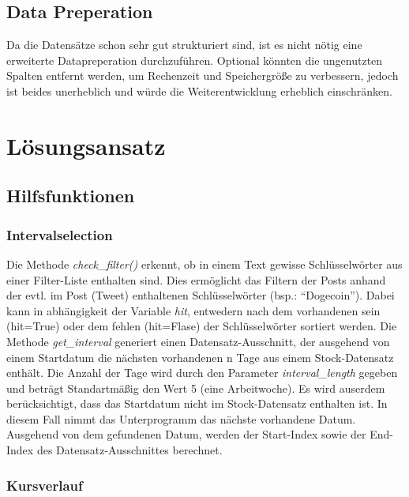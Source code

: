 \documentclass{article}
\begin{document}
\subsection{Data Preperation}
Da die Datensätze schon sehr gut strukturiert sind, ist es nicht nötig eine erweiterte Datapreperation durchzuführen.
Optional könnten die ungenutzten Spalten entfernt werden, um Rechenzeit und Speichergröße zu verbessern, jedoch ist beides unerheblich und würde die Weiterentwicklung erheblich einschränken.



\section{Lösungsansatz}


\subsection{Hilfsfunktionen}

\subsubsection{Intervalselection}
Die Methode \textit{check\_filter()} erkennt, ob in einem Text gewisse Schlüsselwörter aus einer Filter-Liste enthalten sind.
Dies ermöglicht das Filtern der Posts anhand der evtl. im Post (Tweet) enthaltenen Schlüsselwörter (bsp.: ``Dogecoin'').
Dabei kann in abhängigkeit der Variable \textit{hit}, entwedern nach dem vorhandenen sein (hit=True) oder dem fehlen (hit=Flase) der Schlüsselwörter sortiert werden.
Die Methode \textit{get\_interval} generiert einen Datensatz-Ausschnitt, der ausgehend von einem Startdatum die nächsten vorhandenen n Tage aus einem Stock-Datensatz enthält.
Die Anzahl der Tage wird durch den Parameter \textit{interval\_length} gegeben und beträgt Standartmäßig den Wert 5 (eine Arbeitwoche).
Es wird auserdem berücksichtigt, dass das Startdatum nicht im Stock-Datensatz enthalten ist.
In diesem Fall nimmt das Unterprogramm das nächste vorhandene Datum.
Ausgehend von dem gefundenen Datum, werden der Start-Index sowie der End-Index des Datensatz-Ausschnittes berechnet.

\subsubsection{Kursverlauf}
\end{document}
